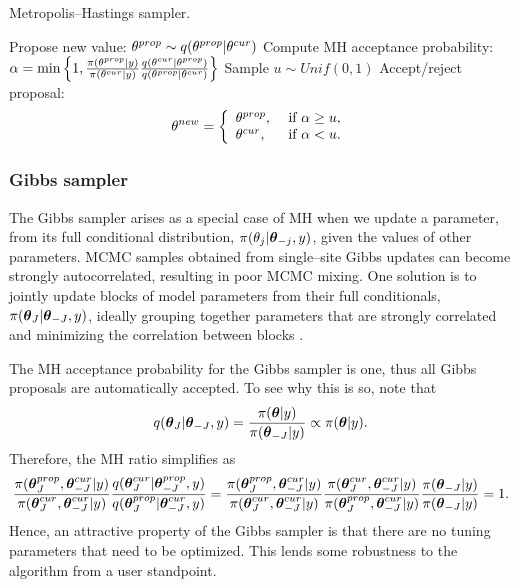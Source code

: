 \begin{algorithm}[htbp]
	\caption{Metropolis--Hastings sampler.}
	\label{alg:metropolis_hastings}
	\begin{algorithmic}[1]
		\State Propose new value: $ \theta^{prop} \sim q(\theta^{prop}|\theta^{cur}) $
		\State Compute MH acceptance probability: $ \alpha = \min\left \lbrace 1, \frac{\pi(\theta^{prop}|y)}{\pi(\theta^{cur}|y)}\frac{q(\theta^{cur}|\theta^{prop})}{q(\theta^{prop}|\theta^{cur})}\right \rbrace $
		\State Sample $ u\sim Unif(0,1) $
		\State Accept/reject proposal: \vspace{-0.1in}
			\begin{equation*}
			\theta^{new} = \left\lbrace \begin{array}{ll}
			\theta^{prop},&\ \text{if}\ \alpha \geq u,\\
			\theta^{cur},&\ \text{if}\ \alpha < u.
			\end{array} \right.
			\end{equation*}
		\EndProcedure
	\end{algorithmic}
\end{algorithm}

\subsubsection{Gibbs sampler}
\label{subsubsec:gibbs}

The Gibbs sampler \cite{geman1984stochastic} arises as a special case of MH when we update a parameter, from its full conditional distribution, $ \pi(\theta_j|\boldsymbol{\theta}_{-j},y) $, given the values of other parameters. MCMC samples obtained from single--site Gibbs updates can become strongly autocorrelated, resulting in poor MCMC mixing. One solution is to jointly update blocks of model parameters from their full conditionals, $ \pi(\boldsymbol{\theta}_{J}|\boldsymbol{\theta}_{-J},y) $, ideally grouping together parameters that are strongly correlated and minimizing the correlation between blocks \cite{knorr2002block,roberts1997updating,rue2005gaussian}.

The MH acceptance probability for the Gibbs sampler is one, thus all Gibbs proposals are automatically accepted. To see why this is so, note that $$q(\boldsymbol{\theta}_{J}|\boldsymbol{\theta}_{-J},y) = \frac{\pi(\boldsymbol{\theta}|y)}{\pi(\boldsymbol{\theta}_{-J}|y)} \propto\pi(\boldsymbol{\theta}|y).$$
Therefore, the MH ratio simplifies as
\begin{align*}
\frac{\pi(\boldsymbol{\theta}_J^{prop},\boldsymbol{\theta}_{-J}^{cur}|y)}{\pi(\boldsymbol{\theta}_J^{cur},\boldsymbol{\theta}_{-J}^{cur}|y)}\frac{q(\boldsymbol{\theta}_J^{cur}|\boldsymbol{\theta}_{-J}^{prop},y)}{q(\boldsymbol{\theta}_J^{prop}|\boldsymbol{\theta}_{-J}^{cur},y)} &= \frac{\pi(\boldsymbol{\theta}_J^{prop},\boldsymbol{\theta}_{-J}^{cur}|y)}{\pi(\boldsymbol{\theta}_J^{cur},\boldsymbol{\theta}_{-J}^{cur}|y)}\frac{\pi(\boldsymbol{\theta}_J^{cur},\boldsymbol{\theta}_{-J}^{cur}|y)}{\pi(\boldsymbol{\theta}_J^{prop},\boldsymbol{\theta}_{-J}^{cur}|y)}\frac{\pi(\boldsymbol{\theta}_{-J}|y)}{\pi(\boldsymbol{\theta}_{-J}|y)} = 1. \\
\end{align*}
Hence, an attractive property of the Gibbs sampler is that there are no tuning parameters that need to be optimized. This lends some robustness to the algorithm from a user standpoint.  

